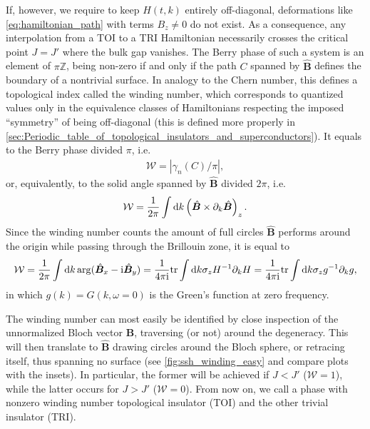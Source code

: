 If, however, we require to keep $H(t,k)$ entirely off-diagonal, deformations like \cref{eq:hamiltonian_path} with terms $B_z\neq0$ do not exist.
As a consequence, any interpolation from a TOI to a TRI Hamiltonian necessarily crosses the critical point $J=J'$ where the bulk gap vanishes.
The Berry phase of such a system is an element of $\pi\mathds Z$, being non-zero if and only if the path $C$ spanned by $\hat{\bm B}$ defines the boundary of a nontrivial surface.
In analogy to the Chern number, this defines a topological index called the winding number, which corresponds to quantized values only in the equivalence classes of Hamiltonians respecting the imposed ``symmetry'' of being off-diagonal (this is defined more properly in \cref{sec:Periodic_table_of_topological_insulators_and_superconductors}).
It equals to the Berry phase divided $\pi$, i.e.
\begin{align}
    \mathcal W = |\gamma_n(C)/\pi|,
\end{align}
or, equivalently, to the solid angle spanned by $\hat{\bm B}$ divided $2\pi$, i.e.
\begin{align}
    \mathcal W = \frac1{2\pi}\int\mathrm d k\left( \hat{\bm B}\times\partial_k\hat{\bm B} \right)_z.
\end{align}
Since the winding number counts the amount of full circles $\hat{\bm B}$ performs around the origin while passing through the Brillouin zone, it is equal to
\begin{align}
    \mathcal W = \frac{1}{2\pi}\int\mathrm d k \arg(\hat{\bm B}_x - \mathrm i \hat{\bm B}_y)
    =
    \frac{1}{4\pi\mathrm i} {\rm tr}\int\mathrm d k \sigma_z H^{-1}\partial_k H
    =
    \frac{1}{4\pi\mathrm i} {\rm tr}\int\mathrm d k \sigma_z g^{-1}\partial_k g,
    \label{eq:winding_number}
\end{align}
in which $g(k)=G(k,\omega=0)$ is the Green's function at zero frequency.

The winding number can most easily be identified by close inspection of the unnormalized Bloch vector ${\bm B}$, traversing (or not) around the degeneracy.
This will then translate to $\hat{\bm B}$ drawing circles around the Bloch sphere, or retracing itself, thus spanning no surface (see \cref{fig:ssh_winding_easy} and compare plots with the insets).
In particular, the former will be achieved if $J<J'$ ($\mathcal W=1$), while the latter occurs for $J>J'$ ($\mathcal W=0$).
From now on, we call a phase with nonzero winding number topological insulator (TOI) and the other trivial insulator (TRI).

